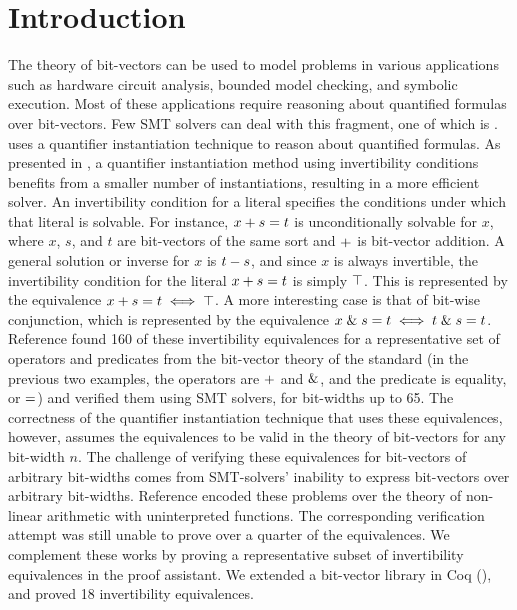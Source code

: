 \documentclass[10pt,conference]{IEEEtran}
\begin{document}
\section{Introduction}
\label{sec:intro}
The theory of bit-vectors can be used to model problems 
in various applications such as hardware circuit analysis, 
bounded model checking, and symbolic execution. Most of 
these applications require reasoning about quantified 
formulas over bit-vectors. Few SMT solvers can deal 
with this fragment, one of which is \cvcfour. \cvcfour 
uses a quantifier 
instantiation technique to reason about quantified formulas. 
As presented in \cite{b1}, a quantifier instantiation 
method using invertibility conditions benefits from a smaller 
number of instantiations, resulting in a more efficient 
solver. An invertibility condition for a literal specifies 
the conditions under which that literal is solvable. For 
instance, $x + s = t$ is unconditionally solvable 
for $x$, where $x$, $s$, and $t$ are bit-vectors of the 
same sort and $+$ is bit-vector addition. 
A general solution or inverse for $x$ is $t - s$, and 
since $x$ is always invertible, the invertibility condition 
for the literal $x + s = t$ is 
simply $\top$. This is represented by the equivalence 
$x + s = t \iff \top$. 
A more interesting case is that 
of bit-wise conjunction, which is represented by the 
equivalence 
$x \mathrel{\&} s = t \iff t \mathrel{\&} s = t$.
Reference \cite{b1} found 
160 of these invertibility equivalences for a 
representative set of operators and predicates from the 
bit-vector theory of the \smtlib standard 
(in the previous two examples, the operators are 
$+$ and $\mathrel{\&}$, 
and the predicate is equality, or $=$) and verified them 
using SMT solvers, for bit-widths up to 65. The correctness of the quantifier 
instantiation technique that uses these equivalences,
however, assumes the equivalences to be valid in the 
theory of bit-vectors for any bit-width $n$.
The challenge of verifying these equivalences for 
bit-vectors of arbitrary bit-widths comes from 
SMT-solvers' inability to express bit-vectors over
arbitrary bit-widths. Reference \cite{b2} encoded 
these problems over the theory of non-linear arithmetic 
with uninterpreted functions. The corresponding verification 
attempt was still unable to prove over a quarter of the 
equivalences. We complement these works by proving a 
representative subset of invertibility equivalences in 
the \coq proof assistant. We extended a bit-vector 
library in Coq (), and proved 18 invertibility equivalences.
\end{document}
